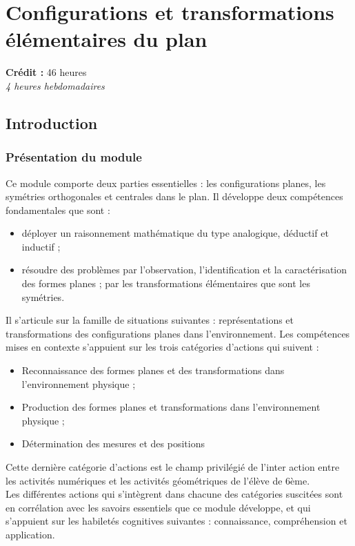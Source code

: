 \chapter{Configurations et transformations élémentaires du plan}

{\AlegreyaSansLight \large
\begin{center}
\textbf{Crédit :} 46 heures\\
\textit{4 heures hebdomadaires}
\end{center}
}

\minitoc

\section{Introduction}

\subsection{Présentation du module}
Ce module comporte deux parties essentielles : les configurations planes, les symétries orthogonales et centrales dans le plan. Il développe deux compétences fondamentales que sont :
\begin{itemize}
\item déployer un raisonnement mathématique du type analogique, déductif et inductif ;
\item résoudre des problèmes par l'observation, l'identification et la caractérisation des formes planes ; par les transformations élémentaires que sont les symétries.
\end{itemize}
Il s'articule sur la famille de situations suivantes : représentations et transformations des configurations planes dans l'environnement. Les compétences mises en contexte s'appuient sur les trois catégories d'actions qui suivent :
\begin{itemize}
\item Reconnaissance des formes planes et des transformations dans l'environnement physique ;
\item Production des formes planes et transformations dans l'environnement physique ;
\item Détermination des mesures et des positions
\end{itemize}
Cette dernière catégorie d'actions est le champ privilégié de l'inter action entre les activités numériques et les activités géométriques de l'élève de 6ème.\\
Les différentes actions qui s'intègrent dans chacune des catégories suscitées sont en corrélation avec les savoirs essentiels que ce module développe, et qui s'appuient sur les habiletés cognitives suivantes : connaissance, compréhension et application.

